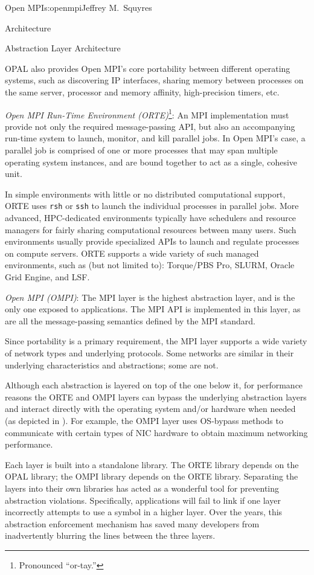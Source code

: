 \begin{aosachapter}{Open MPI}{s:openmpi}{Jeffrey M.\ Squyres}
\begin{aosasect1}{Architecture}
\begin{aosasect2}{Abstraction Layer Architecture}
\begin{aosaitemize}
  OPAL also provides Open MPI's core portability between different
  operating systems, such as discovering IP interfaces, sharing
  memory between processes on the same server, processor and memory
  affinity, high-precision timers, etc.

\item \emph{Open MPI Run-Time Environment (ORTE)}\footnote{Pronounced
    ``or-tay.''}: An MPI implementation must provide not only the
  required message-passing API, but also an accompanying run-time
  system to launch, monitor, and kill parallel jobs.  In Open MPI's
  case, a parallel job is comprised of one or more processes that may
  span multiple operating system instances, and are bound together to
  act as a single, cohesive unit.

  In simple environments with little or no distributed computational
  support, ORTE uses {\tt rsh} or {\tt ssh} to launch the individual
  processes in parallel jobs.  More advanced, HPC-dedicated
  environments typically have schedulers and resource managers for
  fairly sharing computational resources between many users.  Such
  environments usually provide specialized APIs to launch and regulate
  processes on compute servers.  ORTE supports a wide variety of such
  managed environments, such as (but not limited to): Torque/PBS
  Pro, SLURM, Oracle Grid Engine, and LSF.

\item \emph{Open MPI (OMPI)}: The MPI layer is the highest abstraction layer,
  and is the only one exposed to applications.  The MPI API is
  implemented in this layer, as are all the message-passing semantics
  defined by the MPI standard.

  Since portability is a primary requirement, the MPI layer supports a
  wide variety of network types and underlying protocols.  Some
  networks are similar in their underlying characteristics and
  abstractions; some are not.
\end{aosaitemize}

Although each abstraction is layered on top of the one below it, for
performance reasons the ORTE and OMPI layers can bypass the
underlying abstraction layers and interact directly with the operating
system and/or hardware when needed (as depicted in
).  For example, the OMPI layer uses
OS-bypass methods to communicate with certain types of NIC hardware to
obtain maximum networking performance.

Each layer is built into a standalone library.  The ORTE library
depends on the OPAL library; the OMPI library depends on the ORTE
library.
%
Separating the layers into their own libraries has acted as a
wonderful tool for preventing abstraction violations.
%
Specifically, applications will fail to link if one layer incorrectly
attempts to use a symbol in a higher layer.
%
Over the years, this abstraction enforcement mechanism has saved many
developers from inadvertently blurring the lines between the three
layers.


\end{aosasect2}
\end{aosasect1}
\end{aosachapter}
